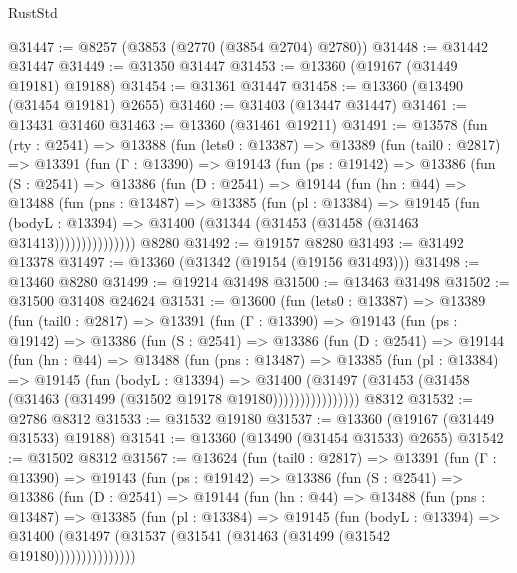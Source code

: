 \begin{lexlean}{RustStd}
\begin{coremodule}
@31447 := @8257 (@3853 (@2770 (@3854 @2704) @2780))
@31448 := @31442 @31447
@31449 := @31350 @31447
@31453 := @13360 (@19167 (@31449 @19181) @19188)
@31454 := @31361 @31447
@31458 := @13360 (@13490 (@31454 @19181) @2655)
@31460 := @31403 (@13447 @31447)
@31461 := @13431 @31460
@31463 := @13360 (@31461 @19211)
@31491 := @13578
    (fun (rty : @2541) =>
    @13388
      (fun (lets0 : @13387) =>
      @13389
        (fun (tail0 : @2817) =>
        @13391
          (fun (Γ : @13390) =>
          @19143
            (fun (ps : @19142) =>
            @13386
              (fun (S : @2541) =>
              @13386
                (fun (D : @2541) =>
                @19144
                  (fun (hn : @44) =>
                  @13488
                    (fun (pns : @13487) =>
                    @13385
                      (fun (pl : @13384) =>
                      @19145
                        (fun (bodyL : @13394) =>
                        @31400 (@31344 (@31453 (@31458 (@31463 @31413)))))))))))))))
    @8280
@31492 := @19157 @8280
@31493 := @31492 @13378
@31497 := @13360 (@31342 (@19154 (@19156 @31493)))
@31498 := @13460 @8280
@31499 := @19214 @31498
@31500 := @13463 @31498
@31502 := @31500 @31408 @24624
@31531 := @13600
    (fun (lets0 : @13387) =>
    @13389
      (fun (tail0 : @2817) =>
      @13391
        (fun (Γ : @13390) =>
        @19143
          (fun (ps : @19142) =>
          @13386
            (fun (S : @2541) =>
            @13386
              (fun (D : @2541) =>
              @19144
                (fun (hn : @44) =>
                @13488
                  (fun (pns : @13487) =>
                  @13385
                    (fun (pl : @13384) =>
                    @19145
                      (fun (bodyL : @13394) =>
                      @31400
                        (@31497
                          (@31453 (@31458 (@31463 (@31499 (@31502 @19178 @19180))))))))))))))))
    @8312
@31532 := @2786 @8312
@31533 := @31532 @19180
@31537 := @13360 (@19167 (@31449 @31533) @19188)
@31541 := @13360 (@13490 (@31454 @31533) @2655)
@31542 := @31502 @8312
@31567 := @13624
    (fun (tail0 : @2817) =>
    @13391
      (fun (Γ : @13390) =>
      @19143
        (fun (ps : @19142) =>
        @13386
          (fun (S : @2541) =>
          @13386
            (fun (D : @2541) =>
            @19144
              (fun (hn : @44) =>
              @13488
                (fun (pns : @13487) =>
                @13385
                  (fun (pl : @13384) =>
                  @19145
                    (fun (bodyL : @13394) =>
                    @31400 (@31497 (@31537 (@31541 (@31463 (@31499 (@31542 @19180)))))))))))))))

\end{coremodule}
\end{lexlean}
